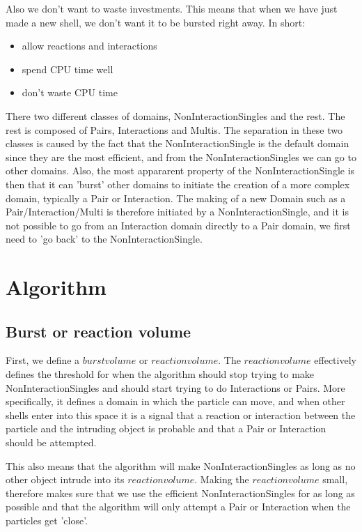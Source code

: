 \documentclass[a4paper,11pt]{article}
\begin{document}
Also we don't want to waste investments. This means that when we have just made a new
shell, we don't want it to be bursted right away. In short:
\begin{itemize}
 \item allow reactions and interactions
 \item spend CPU time well
 \item don't waste CPU time
\end{itemize}

There two different classes of domains, NonInteractionSingles and the rest. The rest is composed of
Pairs, Interactions and Multis. The separation in these two classes is caused by the fact that the NonInteractionSingle
is the default domain since they are the most efficient, and from the NonInteractionSingles we can go to other domains.
Also, the most appararent property of the NonInteractionSingle is then that it can 'burst' other domains to initiate the
creation of a more complex domain, typically a Pair or Interaction.
The making of a new Domain such as a Pair/Interaction/Multi is therefore initiated by a NonInteractionSingle, and it is
not possible to go from an Interaction domain directly to a Pair domain, we first need to 'go back' to the
NonInteractionSingle.

\section{Algorithm}
\subsection{Burst or reaction volume}
First, we define a $burst volume$ or $reaction volume$. The
$reaction volume$ effectively defines the threshold for when the algorithm should stop trying to make NonInteractionSingles and
should start trying to do Interactions or Pairs.
More specifically, it defines a domain in which the particle can move, and when other shells enter into this space it is a
signal that a reaction or interaction between the particle and the intruding object is probable and that a Pair or Interaction
should be attempted.

This also means that the algorithm will make NonInteractionSingles as long as no other object intrude into its
$reaction volume$. Making the $reaction volume$ small, therefore makes sure that we use the efficient NonInteractionSingles
for as long as possible and that the algorithm will only attempt a Pair or Interaction when the particles get 'close'.
\end{document}
